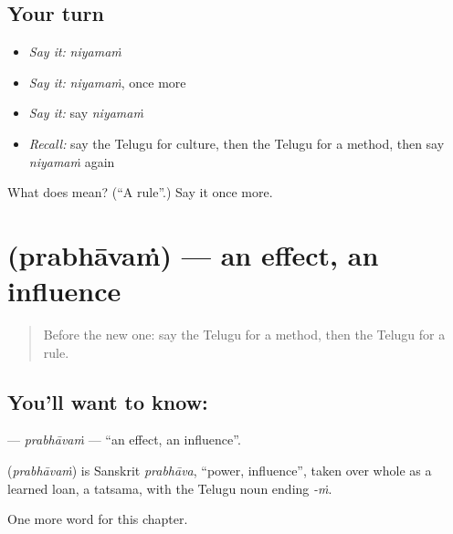 \subsection*{Your turn}
\begin{itemize}
\raggedright
  \item \emph{Say it:} \emph{niyamaṁ}
  \item \emph{Say it:} \emph{niyamaṁ}, once more
  \item \emph{Say it:} say \emph{niyamaṁ}
  \item \emph{Recall:} say the Telugu for culture, then the Telugu for a method, then say \emph{niyamaṁ} again
\end{itemize}

\begin{tcolorbox}[breakable,colback=teal!4,colframe=teal!35!black,title={Before you move on}]
What does  mean? (\textquotedblleft{}A rule\textquotedblright{}.) Say it once more.
\end{tcolorbox}
\section[\texorpdfstring{\te{ప్రభావం} (prabhāvaṁ)}{ప్రభావం (prabhāvaṁ)}]{ (prabhāvaṁ) — an effect, an influence}

\label{lesson:TE-C258-prabhavam}



\begin{quote}
Before the new one: say the Telugu for a method, then the Telugu for a rule.
\end{quote}

\subsection*{You'll want to know: }
\textbf{} — \emph{prabhāvaṁ} — \textquotedblleft{}an effect, an influence\textquotedblright{}.

\begin{cousinweb}
\textbf{} (\emph{prabhāvaṁ}) is Sanskrit \emph{prabhāva}, \textquotedblleft{}power, influence\textquotedblright{}, taken over whole as a learned loan, a tatsama, with the Telugu noun ending \emph{-ṁ}.
\end{cousinweb}

\begin{grammarlens}[title={What you've built}]
One more word for this chapter.
\end{grammarlens}


